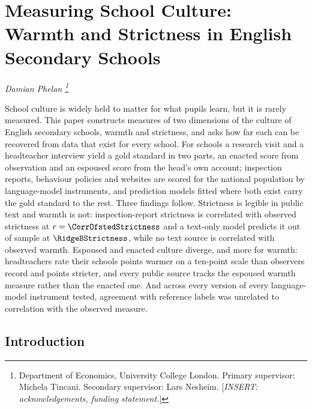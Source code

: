 
\chapter{Measuring School Culture: Warmth and Strictness in English Secondary Schools}
\label{ch:paper1}
\resetcounterformats

\begin{center}
  \textit{Damian Phelan%
    \thanks{Department of Economics, University College London.
      Primary supervisor: Michela Tincani. Secondary supervisor: Lars Nesheim.
      [\textit{INSERT: acknowledgements, funding statement.}]}}
\end{center}

\begin{chapterabstract}
School culture is widely held to matter for what pupils learn, but it is
rarely measured. This paper constructs measures of two dimensions of the
culture of English secondary schools, warmth and strictness, and asks how far
each can be recovered from data that exist for every school. For \NTierOne{}
schools a research visit and a headteacher interview yield a gold standard in
two parts, an enacted score from observation and an espoused score from the
head's own account; inspection reports, behaviour policies and websites are
scored for the national population by language-model instruments, and
prediction models fitted where both exist carry the gold standard to the
rest. Three findings follow. Strictness is legible in public text and warmth
is not: inspection-report strictness is correlated with observed strictness at
$r = \CorrOfstedStrictness$ and a text-only model predicts it out of sample at
$\RidgeBStrictness$, while no text source is correlated with observed warmth.
Espoused and enacted culture diverge, and more for warmth: headteachers rate
their schools \GapWarmth{} points warmer on a ten-point scale than observers
record and \GapStrictness{} points stricter, and every public source tracks the
espoused warmth measure rather than the enacted one. And across every version
of every language-model instrument tested, agreement with reference labels was
unrelated to correlation with the observed measure.
\end{chapterabstract}

\section{Introduction}
\label{sec:p1_intro}

